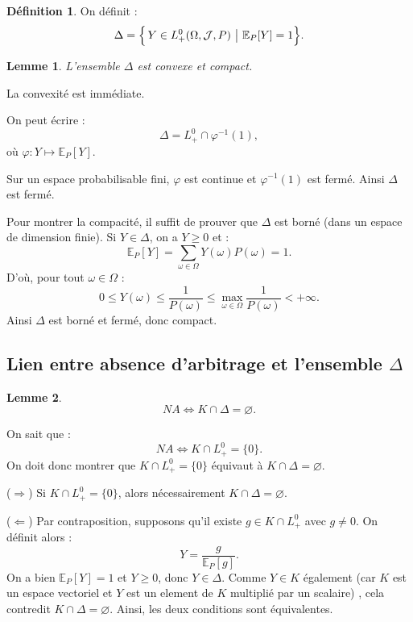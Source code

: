 \documentclass[12pt,a4paper]{article}
\makeatletter
\numberwithin{equation}{section}
\theoremstyle{plain} %
\newtheorem{lemme}{Lemme}
\theoremstyle{definition} %
\newtheorem{definition}{Définition}          %
\theoremstyle{remark} %
\theoremstyle{myexample}
\theoremstyle{definition}
\renewenvironment{proof}[1][\proofname]{%
  \par\vspace{0.8em}%
  \pushQED{\qed}%
  \normalfont\color{cyan}%
  \topsep6\p@\@plus6\p@\relax
  \trivlist
  \item[\hskip\labelsep\bfseries\color{cyan}#1\@addpunct{.}]\ignorespaces
}{%
  \popQED\endtrivlist\vspace{0.8em}%
}
\makeatother
\begin{document}
\begin{definition}
On définit :
\[
\Delta = \Bigl\{\, Y \in L_+^0(\Omega, \mathcal{J}, P) \ \big|\ \mathbb{E}_P[Y] = 1 \Bigr\}.
\]
\end{definition}

\begin{lemme}
L’ensemble $\Delta$ est convexe et compact.
\end{lemme}

\begin{proof}
La convexité est immédiate.

On peut écrire :
\[
\Delta = L_+^0 \cap \varphi^{-1}(1),
\]
où $\varphi : Y \mapsto \mathbb{E}_P[Y]$.

Sur un espace probabilisable fini, $\varphi$ est continue et $\varphi^{-1}(1)$ est fermé.  
Ainsi $\Delta$ est fermé.

Pour montrer la compacité, il suffit de prouver que $\Delta$ est borné (dans un espace de dimension finie).  
Si $Y \in \Delta$, on a $Y \ge 0$ et :
\[
\mathbb{E}_P[Y] = \sum_{\omega \in \Omega} Y(\omega) P(\omega) = 1.
\]
D’où, pour tout $\omega \in \Omega$ :
\[
0 \le Y(\omega) \le \frac{1}{P(\omega)} \le \max_{\omega \in \Omega} \frac{1}{P(\omega)} < +\infty.
\]
Ainsi $\Delta$ est borné et fermé, donc compact.
\end{proof}

\subsection{Lien entre absence d’arbitrage et l’ensemble $\Delta$}

\begin{lemme}
\[
NA \Longleftrightarrow K \cap \Delta = \varnothing.
\]
\end{lemme}

\begin{proof}
On sait que :
\[
NA \Longleftrightarrow K \cap L_+^0 = \{0\}.
\]
On doit donc montrer que $K \cap L_+^0 = \{0\}$ équivaut à $K \cap \Delta = \varnothing$.

\medskip
\noindent
($\Rightarrow$)  
Si $K \cap L_+^0 = \{0\}$, alors nécessairement $K \cap \Delta = \varnothing$.

\medskip
\noindent
($\Leftarrow$)  
Par contraposition, supposons qu’il existe $g \in K \cap L_+^0$ avec $g \neq 0$.  
On définit alors :
\[
Y = \frac{g}{\mathbb{E}_P[g]}.
\]
On a bien $\mathbb{E}_P[Y] = 1$ et $Y \ge 0$, donc $Y \in \Delta$.  
Comme $Y \in K$ également (car $K$ est un espace vectoriel et $Y$ est un element de $K$ multiplié par un scalaire)  , cela contredit $K \cap \Delta = \varnothing$.  
Ainsi, les deux conditions sont équivalentes.
\end{proof}
\end{document}
